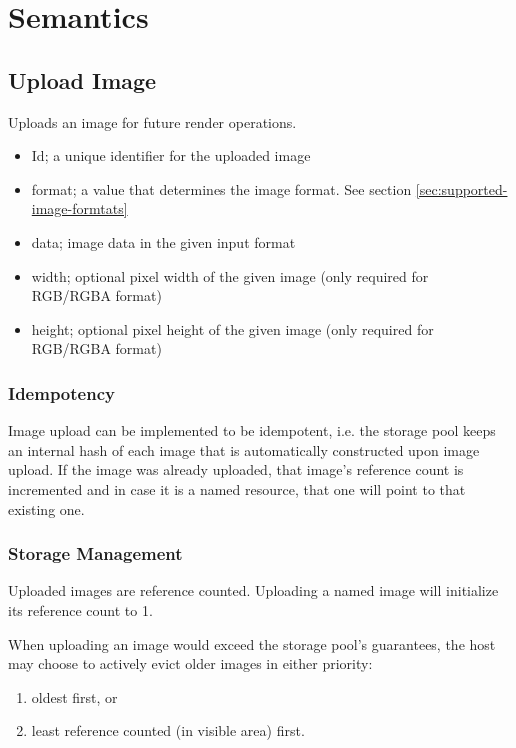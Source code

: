 \documentclass{article}
\begin{document}
\section{Semantics} %

\subsection{Upload Image}

Uploads an image for future render operations.

\begin{itemize}
    \item Id; a unique identifier for the uploaded image
    \item format; a value that determines the image format. See section \ref{sec:supported-image-formtats}
    \item data; image data in the given input format
    \item width; optional pixel width of the given image (only required for RGB/RGBA format)
    \item height; optional pixel height of the given image (only required for RGB/RGBA format)
\end{itemize}

\subsubsection{Idempotency}

Image upload can be implemented to be idempotent, i.e. the storage pool keeps an internal hash
of each image that is automatically constructed upon image upload.
If the image was already uploaded, that image's reference count is incremented
and in case it is a named resource, that one will point to that existing one.

\subsubsection{Storage Management}

Uploaded images are reference counted. Uploading a named image will initialize its reference count to 1.

When uploading an image would exceed the storage pool's guarantees,
the host may choose to actively evict older images in either priority:

\begin{enumerate}
    \item oldest first, or
    \item least reference counted (in visible area) first.
\end{enumerate}
\end{document}
